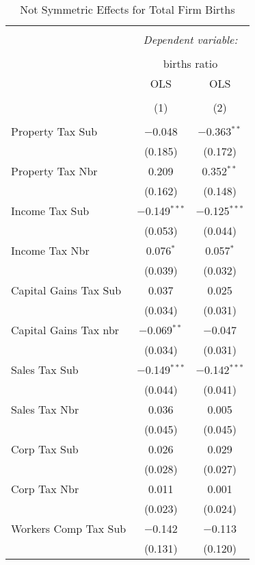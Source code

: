 
\begin{table}[!htbp] \centering 
  \caption{Not Symmetric Effects for  Total Firm Births} 
  \label{--noequality} 
\begin{tabular}{@{\extracolsep{5pt}}lcc} 
\\[-1.8ex]\hline 
\hline \\[-1.8ex] 
 & \multicolumn{2}{c}{\textit{Dependent variable:}} \\ 
\cline{2-3} 
\\[-1.8ex] & \multicolumn{2}{c}{births ratio} \\ 
 & OLS & OLS \\ 
\\[-1.8ex] & (1) & (2)\\ 
\hline \\[-1.8ex] 
 Property Tax Sub & $-$0.048 & $-$0.363$^{**}$ \\ 
  & (0.185) & (0.172) \\ 
  Property Tax Nbr & 0.209 & 0.352$^{**}$ \\ 
  & (0.162) & (0.148) \\ 
  Income Tax Sub & $-$0.149$^{***}$ & $-$0.125$^{***}$ \\ 
  & (0.053) & (0.044) \\ 
  Income Tax Nbr & 0.076$^{*}$ & 0.057$^{*}$ \\ 
  & (0.039) & (0.032) \\ 
  Capital Gains Tax Sub & 0.037 & 0.025 \\ 
  & (0.034) & (0.031) \\ 
  Capital Gains Tax nbr & $-$0.069$^{**}$ & $-$0.047 \\ 
  & (0.034) & (0.031) \\ 
  Sales Tax Sub & $-$0.149$^{***}$ & $-$0.142$^{***}$ \\ 
  & (0.044) & (0.041) \\ 
  Sales Tax Nbr & 0.036 & 0.005 \\ 
  & (0.045) & (0.045) \\ 
  Corp Tax Sub & 0.026 & 0.029 \\ 
  & (0.028) & (0.027) \\ 
  Corp Tax Nbr & 0.011 & 0.001 \\ 
  & (0.023) & (0.024) \\ 
  Workers Comp Tax Sub & $-$0.142 & $-$0.113 \\ 
  & (0.131) & (0.120) \\ 

\end{tabular}
\end{table}
